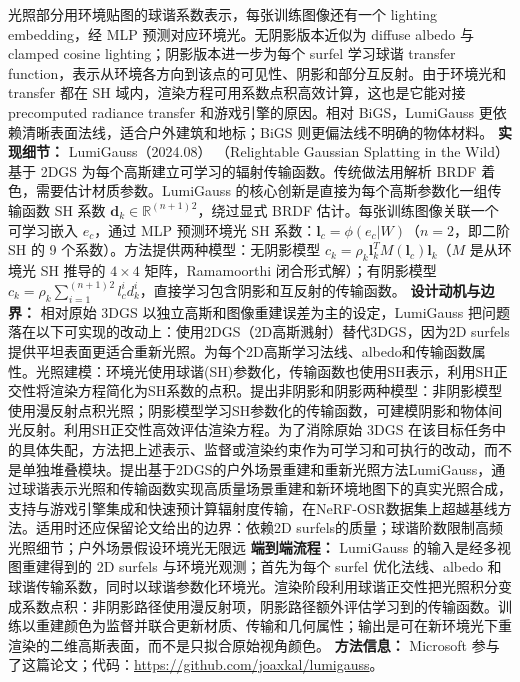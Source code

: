 光照部分用环境贴图的球谐系数表示，每张训练图像还有一个 lighting embedding，经 MLP 预测对应环境光。无阴影版本近似为 diffuse albedo 与 clamped cosine lighting；阴影版本进一步为每个 surfel 学习球谐 transfer function，表示从环境各方向到该点的可见性、阴影和部分互反射。由于环境光和 transfer 都在 SH 域内，渲染方程可用系数点积高效计算，这也是它能对接 precomputed radiance transfer 和游戏引擎的原因。相对 BiGS，LumiGauss 更依赖清晰表面法线，适合户外建筑和地标；BiGS 则更偏法线不明确的物体材料。
\textbf{实现细节：} LumiGauss（2024.08） （Relightable Gaussian Splatting in the Wild）基于 2DGS 为每个高斯建立可学习的辐射传输函数。传统做法用解析 BRDF 着色，需要估计材质参数。LumiGauss 的核心创新是直接为每个高斯参数化一组传输函数 SH 系数 $\mathbf{d}_k \in \mathbb{R}^{(n+1)^{}2}$，绕过显式 BRDF 估计。每张训练图像关联一个可学习嵌入 $e_c$，通过 MLP 预测环境光 SH 系数：$\mathbf{l}_c = \phi(e_c | W)$（$n=2$，即二阶 SH 的 9 个系数）。方法提供两种模型：无阴影模型 $c_k = \rho_k \mathbf{l}_k^T M(\mathbf{l}_c) \mathbf{l}_k$（$M$ 是从环境光 SH 推导的 $4 \times 4$ 矩阵，Ramamoorthi 闭合形式解）；有阴影模型 $c_k = \rho_k \sum_{i=1}^{(n+1)^{}2} l_c^i d_k^i$，直接学习包含阴影和互反射的传输函数。
\textbf{设计动机与边界：} 相对原始 3DGS 以独立高斯和图像重建误差为主的设定，LumiGauss 把问题落在以下可实现的改动上：使用2DGS（2D高斯溅射）替代3DGS，因为2D surfels提供平坦表面更适合重新光照。为每个2D高斯学习法线、albedo和传输函数属性。光照建模：环境光使用球谐(SH)参数化，传输函数也使用SH表示，利用SH正交性将渲染方程简化为SH系数的点积。提出非阴影和阴影两种模型：非阴影模型使用漫反射点积光照；阴影模型学习SH参数化的传输函数，可建模阴影和物体间光反射。利用SH正交性高效评估渲染方程。为了消除原始 3DGS 在该目标任务中的具体失配，方法把上述表示、监督或渲染约束作为可学习和可执行的改动，而不是单独堆叠模块。提出基于2DGS的户外场景重建和重新光照方法LumiGauss，通过球谐表示光照和传输函数实现高质量场景重建和新环境地图下的真实光照合成，支持与游戏引擎集成和快速预计算辐射度传输，在NeRF-OSR数据集上超越基线方法。适用时还应保留论文给出的边界：依赖2D surfels的质量；球谐阶数限制高频光照细节；户外场景假设环境光无限远
\textbf{端到端流程：} LumiGauss 的输入是经多视图重建得到的 2D surfels 与环境光观测；首先为每个 surfel 优化法线、albedo 和球谐传输系数，同时以球谐参数化环境光。渲染阶段利用球谐正交性把光照积分变成系数点积：非阴影路径使用漫反射项，阴影路径额外评估学习到的传输函数。训练以重建颜色为监督并联合更新材质、传输和几何属性；输出是可在新环境光下重渲染的二维高斯表面，而不是只拟合原始视角颜色。
\textbf{方法信息：} Microsoft 参与了这篇论文；代码：\url{https://github.com/joaxkal/lumigauss}。

